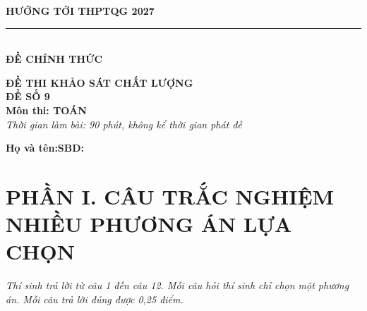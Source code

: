 \documentclass[12pt,a4paper]{article}
\begin{document}
\noindent
\begin{minipage}[t]{0.40\textwidth}
    \centering
    \textbf{HƯỚNG TỚI THPTQG 2027}\\[-2pt]
    \rule{3.2cm}{0.6pt}\\[4pt]
    \textbf{ĐỀ CHÍNH THỨC}
\end{minipage}\hfill
\begin{minipage}[t]{0.58\textwidth}
    \centering
    \textbf{ĐỀ THI KHẢO SÁT CHẤT LƯỢNG}\\
    \textbf{ĐỀ SỐ 9}\\
    \textbf{Môn thi: TOÁN}\\
    \textit{\small Thời gian làm bài: 90 phút, không kể thời gian phát đề}
\end{minipage}

\vspace{0.2cm}
\noindent
\begin{minipage}[b]{0.78\textwidth}
    \textbf{Họ và tên:}\dotfill\textbf{SBD:}\makebox[3.5cm]{\dotfill}
\end{minipage}\hfill
\begin{minipage}[b]{0.20\textwidth}
    \hfill
    \setlength{\fboxrule}{0.8pt}%
\end{minipage}
\vspace{0.2cm}

\section*{\large PHẦN I. CÂU TRẮC NGHIỆM NHIỀU PHƯƠNG ÁN LỰA CHỌN}
\textit{Thí sinh trả lời từ câu 1 đến câu 12. Mỗi câu hỏi thí sinh chỉ chọn một phương án. Mỗi câu trả lời đúng được 0,25 điểm.}
\end{document}
